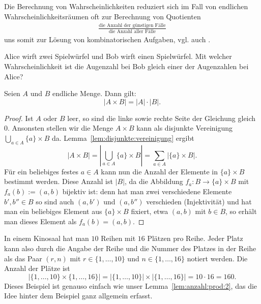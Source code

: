 \begin{bem} 
	Die Berechnung von Wahrscheinlichkeiten reduziert sich im Fall von endlichen Wahrscheinlichkeitsräumen oft zur Berechnung von Quotienten 
	\begin{align*}
			\frac{\text{die Anzahl der günstigen Fälle}}{\text{die Anzahl aller Fälle}}
	\end{align*} 
	uns somit zur Lösung von kombinatorischen Aufgaben, vgl. auch \cite{Tit19}. 
\end{bem} 

\begin{aufg}
	Alice wirft zwei Spielwürfel und Bob wirft einen Spielwürfel. Mit welcher Wahrscheinlichkeit ist die Augenzahl bei Bob gleich einer der Augenzahlen bei Alice? 
\end{aufg} 

\begin{lem} \label{lem:anzahl:prod:2}
	Seien $A$ und $B$ endliche Menge. Dann gilt: 
	\[
		|A \times B| = |A| \cdot |B|. 
	\]
\end{lem}
\begin{proof} 
	Ist $A$ oder $B$ leer, so sind die linke sowie rechte Seite der Gleichung gleich $0$. Ansonsten stellen wir die Menge $A \times B$ kann als disjunkte Vereinigung $\bigcup_{a \in A} \{a\} \times B$ da. Lemma~\ref{lem:disjunkte:vereinigung} ergibt
	\[
		|A \times B| = \left| \bigcup_{a \in A} \{a \} \times B \right| = \sum_{a \in A} | \{a \} \times B |.
	\]
	Für ein beliebiges festes $a \in A$ kann nun die Anzahl der Elemente in $\{a\} \times B$ bestimmt werden. Diese Anzahl ist $|B|$, da die Abbildung $f_a : B \to \{a\} \times B$ mit $f_a(b) := (a,b)$ bijektiv ist: denn hat man zwei verschiedene Elemente $b',b'' \in B$ so sind auch $(a,b')$ und $(a,b'')$ verschieden (Injektivität) und hat man ein beliebiges Element aus $\{a\} \times B$ fixiert, etwa $(a,b)$ mit $b \in B$, so erhält man dieses Element als $f_a(b) = (a,b)$. 
\end{proof} 

\begin{bsp}
	In einem Kinosaal hat man $10$ Reihen mit $16$ Plätzen pro Reihe. Jeder Platz kann also durch die Angabe der Reihe und die Nummer des Platzes in der Reihe als das Paar $(r,n)$ mit $r \in \{1,\ldots,10\}$ und $n \in \{1,\ldots,16\}$ notiert werden. Die Anzahl der Plätze ist 
	\[
			| \{1,\ldots,10\} \times \{1,\ldots,16\} |  = | \{1,\ldots,10\} | \times | \{1,\ldots,16\}| = 10 \cdot 16 = 160. 
	\]
	Dieses Beispiel ist genauso einfach wie unser Lemma~\ref{lem:anzahl:prod:2}, das die Idee hinter dem Beispiel ganz allgemein erfasst. 
\end{bsp} 
 

